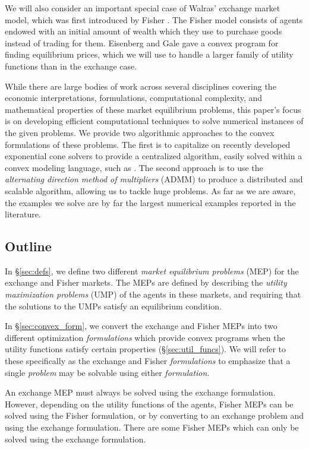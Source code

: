 \documentclass[12pt]{article}
\begin{document}
We will also consider an important special case of Walras' exchange market model,
which was first introduced by Fisher \cite[see][]{brainard2000compute}.
The Fisher model consists of agents endowed with
an initial amount of wealth which they use to purchase goods instead of trading
for them. Eisenberg and Gale \cite{eisenberg1959consensus, gale1960theory,
eisenberg1961aggregation} gave a convex program for finding equilibrium prices,
which we will use to handle a larger family of utility functions than in the
exchange case.

While there are large bodies of work across several disciplines covering the
economic interpretations, formulations, computational complexity, and
mathematical properties of these market equilibrium problems, this paper's
focus is on developing efficient computational techniques to solve
numerical instances of the given problems.
We provide two algorithmic approaches to the convex formulations
of these problems. The first is to capitalize on recently
developed exponential cone solvers \cite{scs} to provide a centralized
algorithm, easily solved within a convex modeling language, such as \cite{cvxpy,
cvx}. The second approach is to use the \emph{alternating direction method of
multipliers} (ADMM) \cite{boyd2011distributed} to produce a distributed and
scalable algorithm, allowing us to tackle huge problems.
As far as we are aware, the examples we solve are by far the largest
numerical examples reported in the literature.


\subsection{Outline}

In \S\ref{sec:defs}, we define two different \emph{market equilibrium problems}
(MEP) for the exchange and Fisher markets. The MEPs are defined by describing
the \emph{utility maximization problems} (UMP) of the agents in these markets,
and requiring that the solutions to the UMPs satisfy an equilibrium condition.

In \S\ref{sec:convex_form}, we convert the exchange and Fisher MEPs into two
different optimization \emph{formulations} which provide convex programs when
the utility functions satisfy certain properties (\S\ref{sec:util_funcs}). We
will refer to these specifically as the exchange and Fisher \emph{formulations}
to emphasize that a single \emph{problem} may be solvable using either
\emph{formulation}.

An exchange MEP must always be solved using the exchange formulation. However,
depending on the utility functions of the agents, Fisher MEPs can be solved
using the Fisher formulation, or by converting to an exchange problem and using
the exchange formulation. There are some Fisher MEPs which can only be solved
using the exchange formulation.
\end{document}
